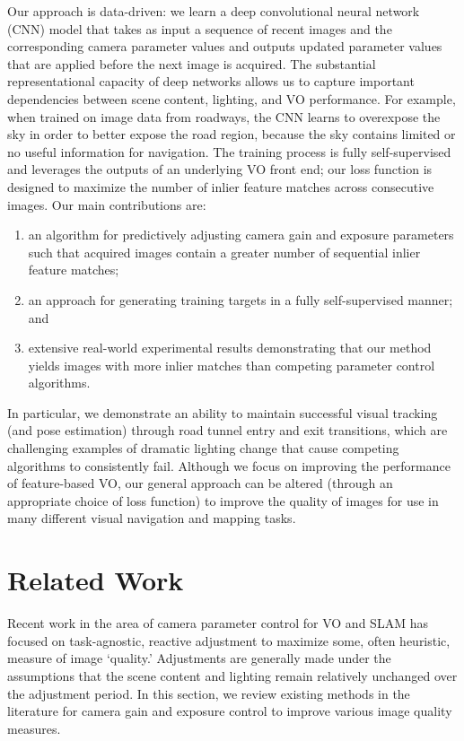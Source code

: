 \documentclass[letterpaper, 10pt, journal, twoside]{IEEEtran}
\begin{document}
Our approach is data-driven: we learn a deep convolutional neural network (CNN) model that takes as input a sequence of recent images and the corresponding camera parameter values and outputs updated parameter values that are applied before the next image is acquired.
The substantial representational capacity of deep networks allows us to capture important dependencies between scene content, lighting, and VO performance. 
For example, when trained on image data from roadways, the CNN learns to overexpose the sky in order to better expose the road region, because the sky contains limited or no useful information for navigation.
The training process is fully self-supervised and leverages the outputs of an underlying VO front end; our loss function is designed to maximize the number of inlier feature matches across consecutive images. 
Our main contributions are: 
\begin{enumerate}
	\item an algorithm for predictively adjusting camera gain and exposure parameters such that acquired images contain a greater number of sequential inlier feature matches;
	\item an approach for generating training targets in a fully self-supervised manner; and
	\item extensive real-world experimental results demonstrating that our method yields images with more inlier matches than competing parameter control algorithms.
\end{enumerate}
%
In particular, we demonstrate an ability to maintain successful visual tracking (and pose estimation) through road tunnel entry and exit transitions, which are challenging examples of dramatic lighting change that cause competing algorithms to consistently fail.
Although we focus on improving the performance of feature-based VO, our general approach can be altered (through an appropriate choice of loss function) to improve the quality of images for use in many different visual navigation and mapping tasks. 
 
\section{Related Work}
\label{sec:related}

Recent work in the area of camera parameter control for VO and SLAM has focused on task-agnostic, reactive adjustment to maximize some, often heuristic, measure of image `quality.' Adjustments are generally made under the assumptions that the scene content and lighting remain relatively unchanged over the adjustment period. 
In this section, we review existing methods in the literature for camera gain and exposure control to improve various image quality measures.
\end{document}
